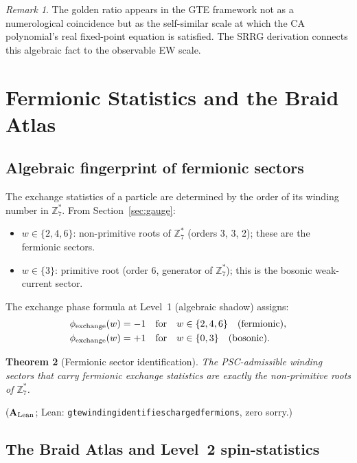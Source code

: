 \documentclass[11pt]{article}
\newtheorem{theorem}{Theorem}[section]
\theoremstyle{remark}
\newtheorem{remark}[theorem]{Remark}
\newcommand{\ZSstar}{\mathbb{Z}_7^*}
\newcommand{\lean}[1]{%
  \penalty-100
  \begingroup\def\_{\textunderscore\allowbreak}\texttt{#1}\endgroup}
\newcommand{\CatAL}{\ensuremath{\textbf{A}_{\rm Lean}}}
\begin{document}
\begin{remark}
The golden ratio appears in the GTE framework not as a numerological coincidence
but as the self-similar scale at which the CA polynomial's real fixed-point
equation is satisfied. The SRRG derivation connects this algebraic fact to the
observable EW scale.
\end{remark}

\section{Fermionic Statistics and the Braid Atlas}
\label{sec:fermions}

\subsection{Algebraic fingerprint of fermionic sectors}
\label{ssec:ferm_algebraic}

The exchange statistics of a particle are determined by the order of its winding
number in $\ZSstar$. From Section~\ref{sec:gauge}:
\begin{itemize}[itemsep=2pt]
\item $w\in\{2,4,6\}$: non-primitive roots of $\ZSstar$ (orders 3, 3, 2);
      these are the fermionic sectors.
\item $w\in\{3\}$: primitive root (order 6, generator of $\ZSstar$);
      this is the bosonic weak-current sector.
\end{itemize}

The exchange phase formula at Level~1 (algebraic shadow) assigns:
\begin{align}
  \phi_{\rm exchange}(w) &= -1 \quad \text{for}\quad w\in\{2,4,6\}\quad
  \text{(fermionic)},\\
  \phi_{\rm exchange}(w) &= +1 \quad \text{for}\quad w\in\{0,3\}\quad
  \text{(bosonic)}.
\end{align}

\begin{theorem}[Fermionic sector identification]
The PSC-admissible winding sectors that carry fermionic exchange statistics are
exactly the non-primitive roots of $\ZSstar$.
\end{theorem}

($\CatAL$; Lean: \lean{gte\_winding\_identifies\_charged\_fermions}, zero sorry.)

\subsection{The Braid Atlas and Level~2 spin-statistics}
\label{ssec:braid_atlas}
\end{document}
